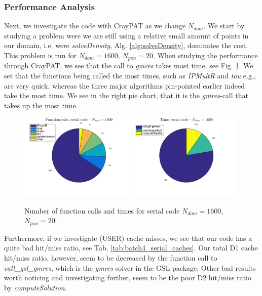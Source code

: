 \documentclass[a4paper,10pt]{article}
\begin{document}
\subsubsection*{Performance Analysis}
Next, we investigate the code with CrayPAT as we change $N_{dom}$. We start by studying a problem were we are still using a relative small amount of points in our domain, i.e. were \textit{solveDensity}, Alg. \ref{alg:solveDensity}, dominates the cost. This problem is run for $N_{dom} = 1600$, $N_{pan}=20$. When studying the performance through CrayPAT, we see that the call to \textit{gmres} takes most time, see Fig. \ref{fig:batch4_serial_pie}. We set that the functions being called the most times, such as \textit{IPMultR} and \textit{tau} e.g., are very quick, whereas the three major algorithms pin-pointed earlier indeed take the most time. We see in the right pie chart, that it is the \textit{gmres}-call that takes up the most time. 
\begin{figure}[ht]
    \begin{center}
        \includegraphics[width=0.49\textwidth]{Graphics/craypat_serial_batch4_calls_pie.png}
        \includegraphics[width=0.49\textwidth]{Graphics/craypat_serial_batch4_time_pie.png}
    \end{center}
    \caption{Number of function calls and times for serial code $N_{dom} = 1600$, $N_{pan} = 20$.}
    \label{fig:batch4_serial_pie}
\end{figure}
Furthermore, if we investigate (USER) cache misses, we see that our code has a quite bad hit/miss ratio, see Tab. \ref{tab:batch4_serial_caches}. Our total D1 cache hit/miss ratio, however, seem to be decreased by the function call to \textit{call\_gsl\_gmres}, which is the \textit{gmres} solver in the GSL-package. Other bad results worth noticing and investigating further, seem to be the poor D2 hit/miss ratio by \textit{computeSolution}. 
\end{document}
